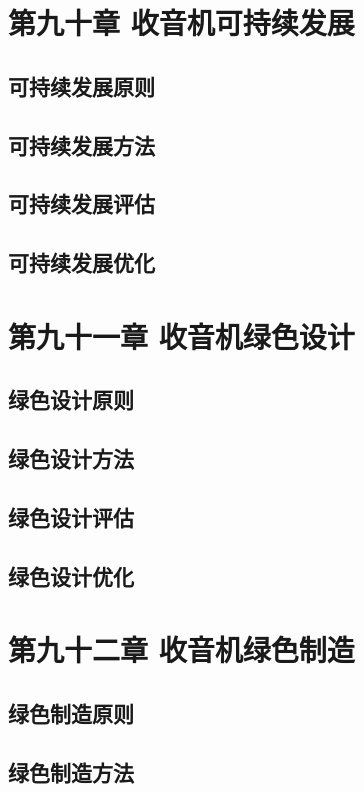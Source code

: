 \documentclass[12pt,UTF8]{ctexbook}
\begin{document}
\chapter{第九十章 收音机可持续发展}

\section{可持续发展原则}
\section{可持续发展方法}
\section{可持续发展评估}
\section{可持续发展优化}

\chapter{第九十一章 收音机绿色设计}

\section{绿色设计原则}
\section{绿色设计方法}
\section{绿色设计评估}
\section{绿色设计优化}

\chapter{第九十二章 收音机绿色制造}

\section{绿色制造原则}
\section{绿色制造方法}
\end{document}
